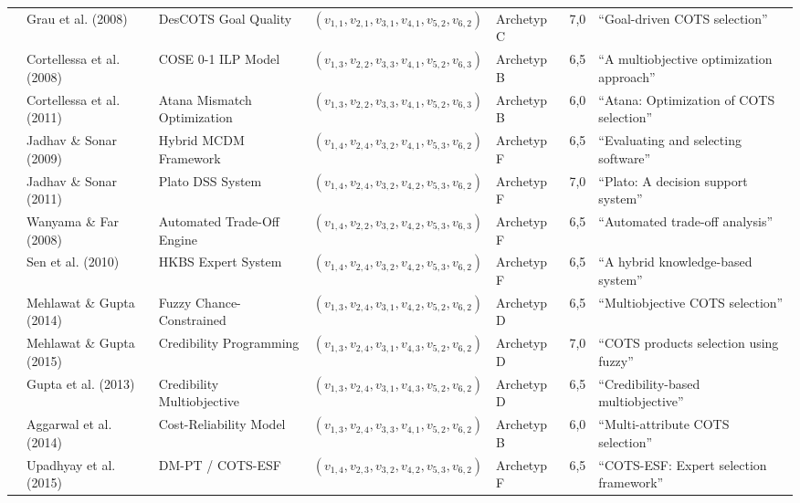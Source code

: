 \begin{longtable}{p{2.0cm} p{2.6cm} p{2.8cm} p{2.7cm} p{2.2cm} p{1.0cm} p{2.5cm}}
\cite{DAU8NSK8} & Grau et al. (2008) & DesCOTS Goal Quality & $(v_{1,1}, v_{2,1}, v_{3,1}, v_{4,1}, v_{5,2}, v_{6,2})$ & Archetyp C & 7,0 & \enquote{Goal-driven COTS selection} \\
\cite{VUVLUN85} & Cortellessa et al. (2008) & COSE 0-1 ILP Model & $(v_{1,3}, v_{2,2}, v_{3,3}, v_{4,1}, v_{5,2}, v_{6,3})$ & Archetyp B & 6,5 & \enquote{A multiobjective optimization approach} \\
\cite{MZ8JHDYA} & Cortellessa et al. (2011) & Atana Mismatch Optimization & $(v_{1,3}, v_{2,2}, v_{3,3}, v_{4,1}, v_{5,2}, v_{6,3})$ & Archetyp B & 6,0 & \enquote{Atana: Optimization of COTS selection} \\
\cite{CI86GRRG} & Jadhav \& Sonar (2009) & Hybrid MCDM Framework & $(v_{1,4}, v_{2,4}, v_{3,2}, v_{4,1}, v_{5,3}, v_{6,2})$ & Archetyp F & 6,5 & \enquote{Evaluating and selecting software} \\
\cite{8VHUMEKY} & Jadhav \& Sonar (2011) & Plato DSS System & $(v_{1,4}, v_{2,4}, v_{3,2}, v_{4,2}, v_{5,3}, v_{6,2})$ & Archetyp F & 7,0 & \enquote{Plato: A decision support system} \\
\cite{WBGP3ETU} & Wanyama \& Far (2008) & Automated Trade-Off Engine & $(v_{1,4}, v_{2,2}, v_{3,2}, v_{4,2}, v_{5,3}, v_{6,3})$ & Archetyp F & 6,5 & \enquote{Automated trade-off analysis} \\
\cite{U4E7VXQU} & Sen et al. (2010) & HKBS Expert System & $(v_{1,4}, v_{2,4}, v_{3,2}, v_{4,2}, v_{5,3}, v_{6,2})$ & Archetyp F & 6,5 & \enquote{A hybrid knowledge-based system} \\
\cite{6YJHIVHG} & Mehlawat \& Gupta (2014) & Fuzzy Chance-Constrained & $(v_{1,3}, v_{2,4}, v_{3,1}, v_{4,2}, v_{5,2}, v_{6,2})$ & Archetyp D & 6,5 & \enquote{Multiobjective COTS selection} \\
\cite{B7ZTQCZZ} & Mehlawat \& Gupta (2015) & Credibility Programming & $(v_{1,3}, v_{2,4}, v_{3,1}, v_{4,3}, v_{5,2}, v_{6,2})$ & Archetyp D & 7,0 & \enquote{COTS products selection using fuzzy} \\
\cite{VRTXHQI7} & Gupta et al. (2013) & Credibility Multiobjective & $(v_{1,3}, v_{2,4}, v_{3,1}, v_{4,3}, v_{5,2}, v_{6,2})$ & Archetyp D & 6,5 & \enquote{Credibility-based multiobjective} \\
\cite{W8P543Y2} & Aggarwal et al. (2014) & Cost-Reliability Model & $(v_{1,3}, v_{2,4}, v_{3,3}, v_{4,1}, v_{5,2}, v_{6,2})$ & Archetyp B & 6,0 & \enquote{Multi-attribute COTS selection} \\
\cite{WZM7DUBY} & Upadhyay et al. (2015) & DM-PT / COTS-ESF & $(v_{1,4}, v_{2,3}, v_{3,2}, v_{4,2}, v_{5,3}, v_{6,2})$ & Archetyp F & 6,5 & \enquote{COTS-ESF: Expert selection framework} \\

\end{longtable}
